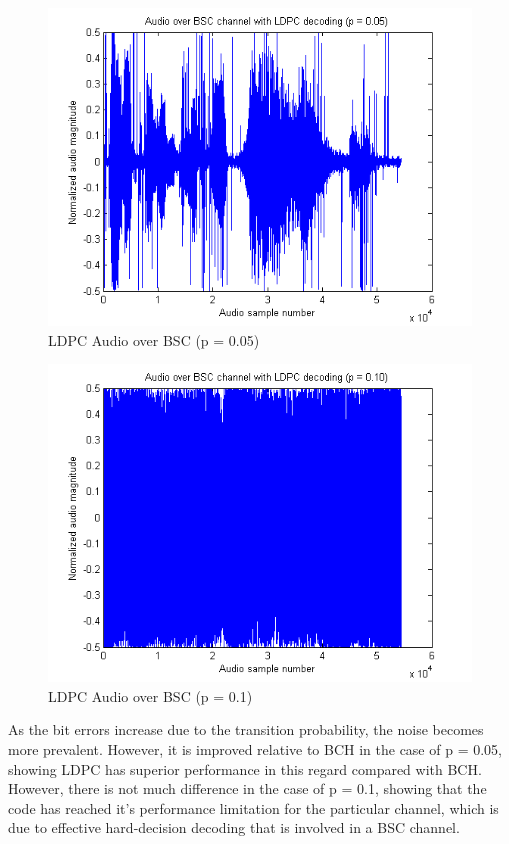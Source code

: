 \documentclass[a4paper]{article}
\begin{document}
\begin{figure}[H]
\centering
\includegraphics[scale=0.5]{plots/audio_over_bsc_ldpc_p_005.png}
\caption{LDPC Audio over BSC (p = 0.05)}
\end{figure}

\begin{figure}[H]
\centering
\includegraphics[scale=0.5]{plots/audio_over_bsc_ldpc_p_010.png}
\caption{LDPC Audio over BSC (p = 0.1)}
\end{figure}

As the bit errors increase due to the transition probability, the noise becomes more prevalent. However, it is improved relative to BCH in the case of p = 0.05, showing LDPC has superior performance in this regard compared with BCH. However, there is not much difference in the case of p = 0.1, showing that the code has reached it's performance limitation for the particular channel, which is due to effective hard-decision decoding that is involved in a BSC channel.
\end{document}
